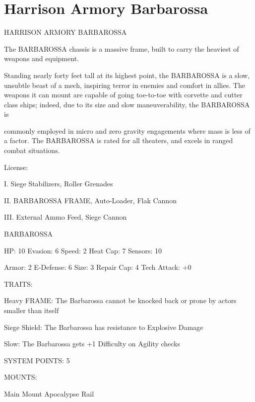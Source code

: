 \section{Harrison Armory Barbarossa}

                           HARRISON ARMORY BARBAROSSA

The BARBAROSSA chassis is a massive frame, built to carry the heaviest of weapons and equipment.

Standing nearly forty feet tall at its highest point, the BARBAROSSA is a slow, unsubtle beast of a mech,
inspiring terror in enemies and comfort in allies. The weapons it can mount are capable of going toe-to-toe
with corvette and cutter class ships; indeed, due to its size and slow maneuverability, the BARBAROSSA is




commonly employed in micro and zero gravity engagements where mass is less of a factor. The
BARBAROSSA is rated for all theaters, and excels in ranged combat situations.

                                                  License:

I. Siege Stabilizers, Roller Grenades

II. BARBAROSSA FRAME, Auto-Loader, Flak Cannon

III. External Ammo Feed, Siege Cannon


                                            BARBAROSSA

 HP: 10         Evasion: 6                           Speed: 2           Heat Cap: 7       Sensors: 10

 Armor:  2      E-Defense: 6                         Size: 3            Repair Cap: 4     Tech Attack:
                                                                                          +0

                                                  TRAITS:

 Heavy FRAME: The Barbarossa cannot be knocked back or prone by actors smaller than itself

 Siege Shield: The Barbarossa has resistance to Explosive Damage

 Slow: The Barbarossa gets +1 Difficulty on Agility checks

                                           SYSTEM POINTS: 5

                                                 MOUNTS:

 Main Mount                                          Apocalypse Rail

